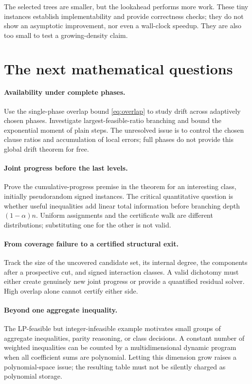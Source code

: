 \documentclass[11pt,a4paper]{article}
\theoremstyle{remark}
\begin{document}
The selected trees are smaller, but the lookahead performs more work.
These tiny instances establish implementability and provide correctness
checks; they do not show an asymptotic improvement, nor even a wall-clock
speedup. They are also too small to test a growing-density claim.

\section{The next mathematical questions}

\paragraph{Availability under complete phases.}
Use the single-phase overlap bound \eqref{eq:overlap} to study drift across
adaptively chosen phases. Investigate largest-feasible-ratio branching and
bound the exponential moment of plain steps. The unresolved issue is to
control the chosen clause ratios and accumulation of local errors; full
phases do not provide this global drift theorem for free.

\paragraph{Joint progress before the last levels.}
Prove the cumulative-progress premise in the theorem for an interesting
class, initially pseudorandom signed instances. The critical quantitative
question is whether useful inequalities add linear total information before
branching depth $(1-\alpha)n$. Uniform assignments and the certificate walk
are different distributions; substituting one for the other is not valid.

\paragraph{From coverage failure to a certified structural exit.}
Track the size of the uncovered candidate set, its internal degree, the
components after a prospective cut, and signed interaction classes. A valid
dichotomy must either create genuinely new joint progress or provide a
quantified residual solver. High overlap alone cannot certify either side.

\paragraph{Beyond one aggregate inequality.}
The LP-feasible but integer-infeasible example motivates small groups of
aggregate inequalities, parity reasoning, or class decisions. A constant
number of weighted inequalities can be counted by a multidimensional dynamic
program when all coefficient sums are polynomial. Letting this dimension
grow raises a polynomial-space issue; the resulting table must not be
silently charged as polynomial storage.
\end{document}
